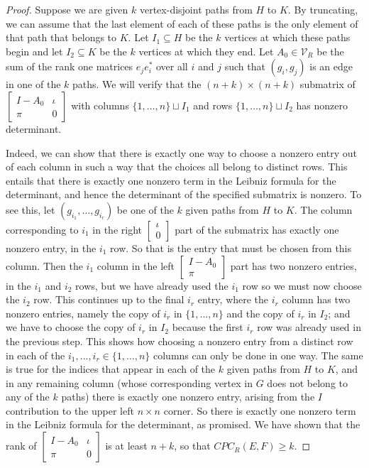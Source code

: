 \documentclass[10pt,a4paper]{amsart}
\begin{document}
\begin{proof}
Suppose we are given $k$ vertex-disjoint paths from $H$ to $K$. By truncating, we can assume that the last element of each of these paths is the only element of that path that belongs to $K$. Let $I_1 \subseteq H$ be the $k$ vertices at which these paths begin and let $I_2 \subseteq K$ be the $k$ vertices at which they end. Let $A_0 \in \mathcal{V}_R$ be the sum of the rank one matrices $e_je_i^*$ over all $i$ and $j$ such that $(g_i, g_j)$ is an edge in one of the $k$ paths. We will verify that the $(n+k)\times(n+k)$ submatrix of $\left[\begin{matrix}I - A_0& \iota\\ \pi&0\end{matrix}\right]$ with columns $\{1, \ldots, n\} \sqcup I_1$ and rows $\{1, \ldots, n\} \sqcup I_2$ has nonzero determinant.

Indeed, we can show that there is exactly one way to choose a nonzero entry out of each column in such a way that the choices all belong to distinct rows. This entails that there is exactly one nonzero term in the Leibniz formula for the determinant, and hence the determinant of the specified submatrix is nonzero. To see this, let $(g_{i_1}, 
\ldots, g_{i_r})$ be one of the $k$ given paths from $H$ to $K$. The column corresponding to $i_1$ in the right $\left[\begin{matrix}\iota \\ 0\end{matrix}\right]$ part of the submatrix has exactly one nonzero entry, in the $i_1$ row. So that is the entry that must be chosen from this column. Then the $i_1$ column in the left $\left[\begin{matrix} I - A_0 \\ \pi\end{matrix}\right]$ part has two nonzero entries, in the $i_1$ and $i_2$ rows, but we have already used the $i_1$ row so we must now choose the $i_2$ row. This continues up to the final $i_r$ entry, where the $i_r$ column has two nonzero entries, namely the copy of $i_r$ in $\{1, \ldots, n\}$ and the copy of $i_r$ in $I_2$; and we have to choose the copy of $i_r$ in $I_2$ because the first $i_r$ row was already used in the previous step. This shows how choosing a nonzero entry from a distinct row in each of the $i_1, \ldots, i_r \in \{1, \ldots, n\}$ columns can only be done in one way. The same is true for the indices that appear in each of the $k$ given paths from $H$ to $K$, and in any remaining column (whose corresponding vertex in $G$ does not belong to any of the $k$ paths) there is exactly one nonzero entry, arising from the $I$ contribution to the upper left $n\times n$ corner. So there is exactly one nonzero term in the Leibniz formula for the determinant, as promised. We have shown that the rank of $\left[\begin{matrix}I - A_0& \iota\\ \pi&0\end{matrix}\right]$ is at least $n + k$, so that $CPC_R(E, F) \geq k$.


\end{proof}
\end{document}
